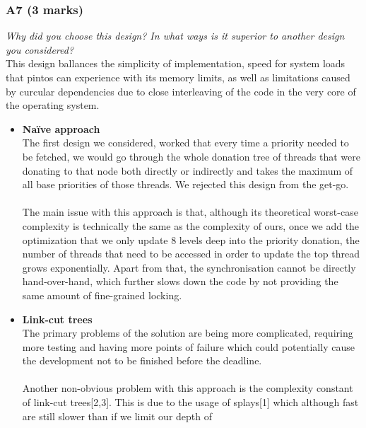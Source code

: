 \documentclass{report}
\newcommand{\question}[1]{\textit{#1} \\ }
\newcommand{\bullpara}[2]{\item \textbf{#1} \ #2}
\begin{document}
                \subsubsection*{A7  (3 marks)}
                    \question{Why did you choose this design? In what ways is it superior to another design you considered?}
                    This design ballances the simplicity of implementation, speed for system loads that pintos can experience with its memory limits,
                    as well as limitations caused by curcular dependencies due to close interleaving of the code in the very core of the operating system.
                    \begin{itemize}
                        \bullpara{Naïve approach}{
                            \\ The first design we considered, worked that every time a priority needed to be fetched, we would go through the whole donation tree of threads 
                            that were donating to that node both directly or indirectly and takes the maximum of all base priorities of those threads. We rejected this design
                            from the get-go. 
                            \\ \\ The main issue with this approach is that, although its theoretical worst-case complexity is 
                            technically the same as the complexity of ours, once we add the optimization that we only update 8 levels deep into the priority donation,
                            the number of threads that need to be accessed in order to update the top thread grows exponentially. Apart from that,
                            the synchronisation cannot be directly hand-over-hand, which further slows down the code by not providing the same amount of fine-grained
                            locking.
                        }
                        \bullpara{Link-cut trees}{
                            \\ The primary problems of the solution are being more complicated, requiring more testing and having more points of failure which
                            could potentially cause the development not to be finished before the deadline. 
                            \\ \\ Another non-obvious problem with this approach is
                            the complexity constant of link-cut trees[2,3]. This is due to the usage of splays[1] which although fast are still slower than if we limit our depth of
}
\end{itemize}
\end{document}
